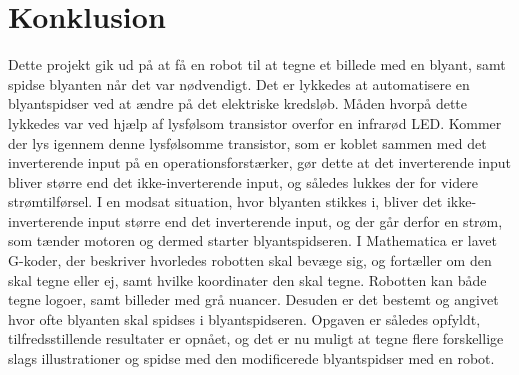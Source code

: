 \section{Konklusion}
Dette projekt gik ud på at få en robot til at tegne et billede med en blyant, samt spidse blyanten når det var nødvendigt. Det er lykkedes at automatisere en blyantspidser ved at ændre på det elektriske kredsløb. Måden hvorpå dette lykkedes var ved hjælp af lysfølsom transistor overfor en infrarød LED. Kommer der lys igennem denne lysfølsomme transistor, som er koblet sammen med det inverterende input på en operationsforstærker, gør dette at det inverterende input bliver større end det ikke-inverterende input, og således lukkes der for videre strømtilførsel. I en modsat situation, hvor blyanten stikkes i, bliver det ikke-inverterende input større end det inverterende input, og der går derfor en strøm, som tænder motoren og dermed starter blyantspidseren. I Mathematica er lavet G-koder, der beskriver hvorledes robotten skal bevæge sig, og fortæller om den skal tegne eller ej, samt hvilke koordinater den skal tegne. Robotten kan både tegne logoer, samt billeder med grå nuancer. Desuden er det bestemt og angivet hvor ofte blyanten skal spidses i blyantspidseren. 
Opgaven er således opfyldt, tilfredsstillende resultater er opnået, og det er nu muligt at tegne flere forskellige slags illustrationer og spidse med den modificerede blyantspidser med en robot. 
